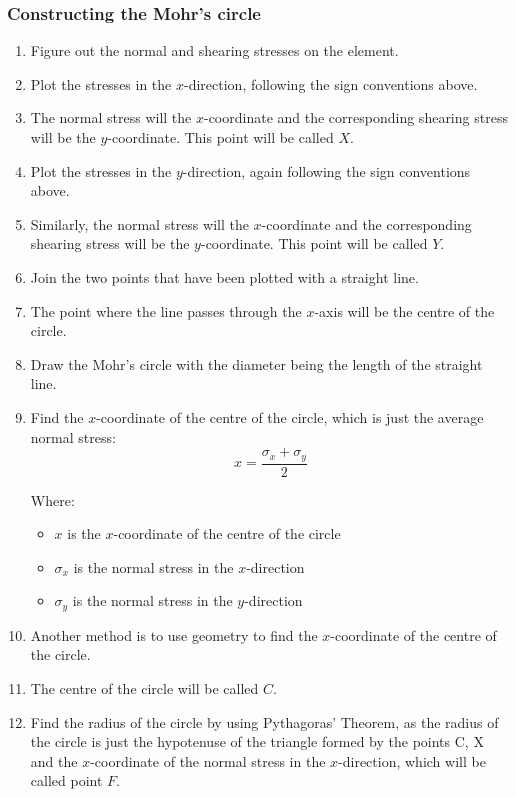 \documentclass[11pt]{article}
\begin{document}
\subsubsection{Constructing the Mohr's circle}
\label{sec:orgfb1a8d3}
\begin{enumerate}
\item Figure out the normal and shearing stresses on the element.
\item Plot the stresses in the \(x\)-direction, following the sign conventions above.
\item The normal stress will the \(x\)-coordinate and the corresponding shearing stress will be the \(y\)-coordinate. This point will be called \(X\).
\item Plot the stresses in the \(y\)-direction, again following the sign conventions above.
\item Similarly, the normal stress will the \(x\)-coordinate and the corresponding shearing stress will be the \(y\)-coordinate. This point will be called \(Y\).
\item Join the two points that have been plotted with a straight line.
\item The point where the line passes through the \(x\)-axis will be the centre of the circle.
\item Draw the Mohr's circle with the diameter being the length of the straight line.
\item Find the \(x\)-coordinate of the centre of the circle, which is just the average normal stress:
\[x = \frac{\sigma_x + \sigma_y}{2}\]

Where:
\begin{itemize}
\item \(x\) is the \(x\)-coordinate of the centre of the circle
\item \(\sigma_x\) is the normal stress in the \(x\)-direction
\item \(\sigma_y\) is the normal stress in the \(y\)-direction
\end{itemize}

\item Another method is to use geometry to find the \(x\)-coordinate of the centre of the circle.
\item The centre of the circle will be called \(C\).
\item Find the radius of the circle by using Pythagoras' Theorem, as the radius of the circle is just the hypotenuse of the triangle formed by the points C, X and the \(x\)-coordinate of the normal stress in the \(x\)-direction, which will be called point \(F\).
\end{enumerate}
\end{document}
